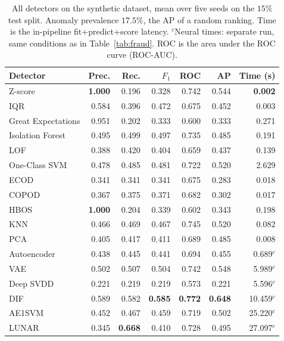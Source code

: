 \documentclass[conference]{IEEEtran}
\begin{document}
\begin{table}[t]
\caption{All detectors on the synthetic dataset, mean over five seeds on
the $15\%$ test split. Anomaly prevalence $17.5\%$, the AP of a random ranking. Time is the in-pipeline fit+predict+score latency. $^{c}$Neural times: separate run, same conditions as in Table~\ref{tab:fraud}. ROC is the area under the ROC curve (ROC-AUC).}
\label{tab:synthetic}
\centering
\setlength{\tabcolsep}{4pt}
\footnotesize
\begin{tabular}{lrrrrrr}
\toprule
Detector & Prec. & Rec. & $F_1$ & ROC & AP & Time (s) \\
\midrule
Z-score            & \textbf{1.000} & 0.196 & 0.328 & 0.742 & 0.544 & \textbf{0.002} \\
IQR                & 0.584 & 0.396 & 0.472 & 0.675 & 0.452 & 0.003 \\
Great Expectations & 0.951 & 0.202 & 0.333 & 0.600 & 0.333 & 0.271 \\
\midrule
Isolation Forest   & 0.495 & 0.499 & 0.497 & 0.735 & 0.485 & 0.191 \\
LOF                & 0.388 & 0.420 & 0.404 & 0.659 & 0.437 & 0.139 \\
One-Class SVM      & 0.478 & 0.485 & 0.481 & 0.722 & 0.520 & 2.629 \\
ECOD               & 0.341 & 0.341 & 0.341 & 0.675 & 0.283 & 0.018 \\
COPOD              & 0.367 & 0.375 & 0.371 & 0.682 & 0.302 & 0.017 \\
HBOS               & \textbf{1.000} & 0.204 & 0.339 & 0.602 & 0.343 & 0.198 \\
KNN                & 0.466 & 0.469 & 0.467 & 0.745 & 0.520 & 0.082 \\
PCA                & 0.405 & 0.417 & 0.411 & 0.689 & 0.485 & 0.008 \\
\midrule
Autoencoder        & 0.438 & 0.445 & 0.441 & 0.694 & 0.455 & 0.689$^{c}$ \\
VAE                & 0.502 & 0.507 & 0.504 & 0.742 & 0.548 & 5.989$^{c}$ \\
Deep SVDD          & 0.221 & 0.219 & 0.219 & 0.573 & 0.221 & 5.596$^{c}$ \\
DIF                & 0.589 & 0.582 & \textbf{0.585} & \textbf{0.772} & \textbf{0.648} & 10.459$^{c}$ \\
AE1SVM             & 0.452 & 0.467 & 0.459 & 0.719 & 0.502 & 25.220$^{c}$ \\
LUNAR              & 0.345 & \textbf{0.668} & 0.410 & 0.728 & 0.495 & 27.097$^{c}$ \\
\bottomrule
\end{tabular}
\end{table}
\end{document}
